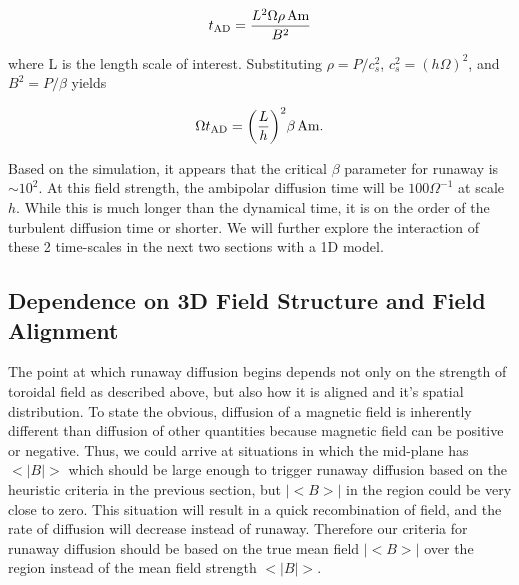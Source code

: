\begin{equation}
t_\text{AD} = \frac{L^2 \Omega \rho \hspace{0.5mm} \text{Am}}{B^2}
\end{equation}

\noindent where L is the length scale of interest. Substituting $\rho=P/c_s^2$, $c_s^2=(h\Omega)^2$, and $B^2=P/\beta$ yields

\begin{equation}
\Omega t_\text{AD} = \bigg(\frac{L}{h}\bigg)^2 \beta \hspace{0.5mm} \text{Am}.
\end{equation}

\noindent Based on the simulation, it appears that the critical $\beta$ parameter for runaway is $\sim 10^2$.  At this field strength, the ambipolar diffusion time will be $100\Omega^{-1}$ at scale $h$.  While this is much longer than the dynamical time, it is on the order of the turbulent diffusion time or shorter.  We will further explore the interaction of these 2 time-scales in the next two sections with a 1D model.   


\subsection{Dependence on 3D Field Structure and Field Alignment}
The point at which runaway diffusion begins depends not only on the strength of toroidal field as described above, but also how it is aligned and it's spatial distribution.  To state the obvious, diffusion of a magnetic field is inherently different than diffusion of other quantities because magnetic field can be positive or negative.  Thus, we could arrive at situations in which the mid-plane has $<|B|>$ which should be large enough to trigger runaway diffusion based on the heuristic criteria in the previous section, but $|<B>|$ in the region could be very close to zero.  This situation will result in a quick recombination of field, and the rate of diffusion will decrease instead of runaway.  Therefore our criteria for runaway diffusion should be based on the true mean field $|<B>|$ over the region instead of the mean field strength $<|B|>$.        

